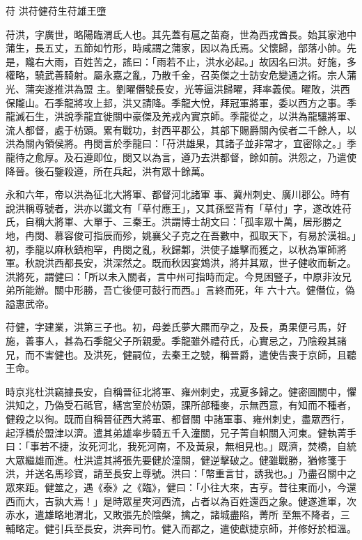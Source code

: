 
\begin{pinyinscope}

 苻
 洪苻健苻生苻雄王墮



 苻洪，字廣世，略陽臨渭氐人也。其先蓋有扈之苗裔，世為西戎酋長。始其家池中蒲生，長五丈，五節如竹形，時咸謂之蒲家，因以為氏焉。父懷歸，部落小帥。先是，隴右大雨，百姓苦之，謠曰：「雨若不止，洪水必起。」故因名曰洪。好施，多權略，驍武善騎射。屬永嘉之亂，乃散千金，召英傑之士訪安危變通之術。宗人蒲光、蒲突遂推洪為盟
 主。劉曜僭號長安，光等逼洪歸曜，拜率義侯。曜敗，洪西保隴山。石季龍將攻上邽，洪又請降。季龍大悅，拜冠軍將軍，委以西方之事。季龍滅石生，洪說季龍宜徙關中豪傑及羌戎內實京師。季龍從之，以洪為龍驤將軍、流人都督，處于枋頭。累有戰功，封西平郡公，其部下賜爵關內侯者二千餘人，以洪為關內領侯將。冉閔言於季龍曰：「苻洪雄果，其諸子並非常才，宜密除之。」季龍待之愈厚。及石遵即位，閔又以為言，遵乃去洪都督，餘如前。洪怨之，乃遣使降晉。後石鑒殺遵，所在兵起，洪有眾十餘萬。



 永和六年，帝以洪為征北大將軍、都督河北諸軍
 事、冀州刺史、廣川郡公。時有說洪稱尊號者，洪亦以讖文有「草付應王」，又其孫堅背有「草付」字，遂改姓苻氏，自稱大將軍、大單于、三秦王。洪謂博士胡文曰：「孤率眾十萬，居形勝之地，冉閔、慕容俊可指辰而殄，姚襄父子克之在吾數中，孤取天下，有易於漢祖。」初，季龍以麻秋鎮枹罕，冉閔之亂，秋歸鄴，洪使子雄擊而獲之，以秋為軍師將軍。秋說洪西都長安，洪深然之。既而秋因宴鴆洪，將并其眾，世子健收而斬之。洪將死，謂健曰：「所以未入關者，言中州可指時而定。今見困豎子，中原非汝兄弟所能辦。關中形勝，吾亡後便可鼓行而西。」言終而死，年
 六十六。健僭位，偽謚惠武帝。



 苻健，字建業，洪第三子也。初，母姜氏夢大羆而孕之，及長，勇果便弓馬，好施，善事人，甚為石季龍父子所親愛。季龍雖外禮苻氏，心實忌之，乃陰殺其諸兄，而不害健也。及洪死，健嗣位，去秦王之號，稱晉爵，遣使告喪于京師，且聽王命。



 時京兆杜洪竊據長安，自稱晉征北將軍、雍州刺史，戎夏多歸之。健密圖關中，懼洪知之，乃偽受石祗官，繕宮室於枋頭，課所部種麥，示無西意，有知而不種者，健殺之以徇。既而自稱晉征西大將軍、都督關
 中諸軍事、雍州刺史，盡眾西行，起浮橋於盟津以濟。遣其弟雄率步騎五千入潼關，兄子菁自軹關入河東。健執菁手曰：「事若不捷，汝死河北，我死河南，不及黃泉，無相見也。」既濟，焚橋，自統大眾繼雄而進。杜洪遣其將張先要健於潼關，健逆擊破之。健雖戰勝，猶修箋于洪，并送名馬珍寶，請至長安上尊號。洪曰：「幣重言甘，誘我也。」乃盡召關中之眾來距。健筮之，遇《泰》之《臨》，健曰：「小往大來，吉亨。昔往東而小，今還西而大，吉孰大焉！」是時眾星夾河西流，占者以為百姓還西之象。健遂進軍，次赤水，遣雄略地渭北，又敗張先於陰槃，擒之，諸城盡陷，菁所
 至無不降者，三輔略定。健引兵至長安，洪奔司竹。健入而都之，遣使獻捷京師，并修好於桓溫。




\end{pinyinscope}
